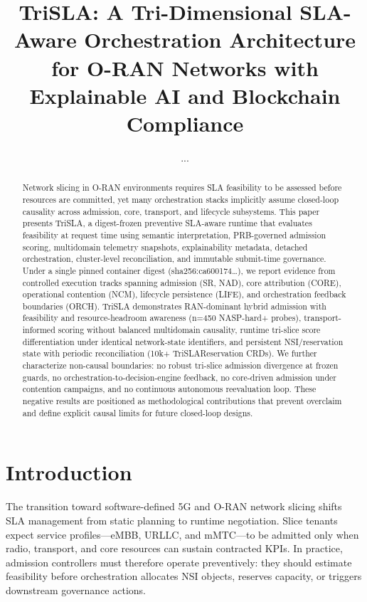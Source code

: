 \documentclass[journal]{IEEEtran}
\begin{document}
\title{TriSLA: A Tri-Dimensional SLA-Aware Orchestration Architecture for O-RAN Networks with Explainable AI and Blockchain Compliance}
\author{...}
\maketitle
\begin{abstract}
Network slicing in O-RAN environments requires SLA feasibility to be assessed before resources are committed, yet many orchestration stacks implicitly assume closed-loop causality across admission, core, transport, and lifecycle subsystems. This paper presents TriSLA, a digest-frozen preventive SLA-aware runtime that evaluates feasibility at request time using semantic interpretation, PRB-governed admission scoring, multidomain telemetry snapshots, explainability metadata, detached orchestration, cluster-level reconciliation, and immutable submit-time governance. Under a single pinned container digest (sha256:ca600174…), we report evidence from controlled execution tracks spanning admission (SR, NAD), core attribution (CORE), operational contention (NCM), lifecycle persistence (LIFE), and orchestration feedback boundaries (ORCH). TriSLA demonstrates RAN-dominant hybrid admission with feasibility and resource-headroom awareness (n=450 NASP-hard+ probes), transport-informed scoring without balanced multidomain causality, runtime tri-slice score differentiation under identical network-state identifiers, and persistent NSI/reservation state with periodic reconciliation (10k+ TriSLAReservation CRDs). We further characterize non-causal boundaries: no robust tri-slice admission divergence at frozen guards, no orchestration-to-decision-engine feedback, no core-driven admission under contention campaigns, and no continuous autonomous reevaluation loop. These negative results are positioned as methodological contributions that prevent overclaim and define explicit causal limits for future closed-loop designs.
\end{abstract}
\section{Introduction}
The transition toward software-defined 5G and O-RAN network slicing shifts SLA management from static planning to runtime negotiation. Slice tenants expect service profiles—eMBB, URLLC, and mMTC—to be admitted only when radio, transport, and core resources can sustain contracted KPIs. In practice, admission controllers must therefore operate preventively: they should estimate feasibility before orchestration allocates NSI objects, reserves capacity, or triggers downstream governance actions.
\end{document}
